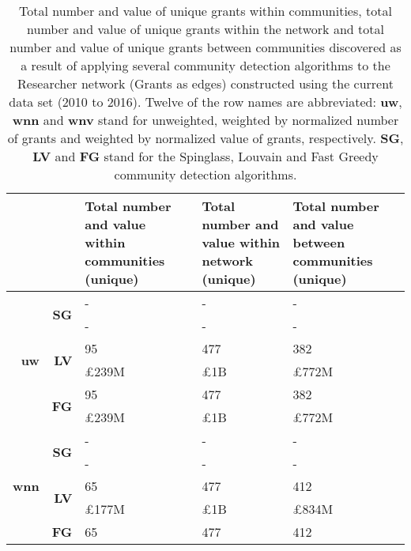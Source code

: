 \begin{table}[!htbp]
\centering
\caption[Total number and value of unique grants within communities, total number and value of unique grants within the network and total number and value of unique grants between communities discovered in the Researcher network (Grants as edges) constructed using the current data set (2010 to 2016)]{Total number and value of unique grants within communities, total number and value of unique grants within the network and total number and value of unique grants between communities discovered as a result of applying several community detection algorithms to the Researcher network (Grants as edges) constructed using the current data set (2010 to 2016). Twelve of the row names are abbreviated: \textbf{uw}, \textbf{wnn} and \textbf{wnv} stand for unweighted, weighted by normalized number of grants and weighted by normalized value of grants, respectively. \textbf{SG}, \textbf{LV} and \textbf{FG} stand for the Spinglass, Louvain and Fast Greedy community detection algorithms.}
\label{table:researcher_b_current_grants2_appendix}
\begin{tabular}{r|r|>{\raggedleft\arraybackslash}p{3.5cm}|>{\raggedleft\arraybackslash}p{3.2cm}|>{\raggedleft\arraybackslash}p{3.5cm}}
\multicolumn{2}{c|}{} & \textbf{Total number and value within communities (unique)} & \textbf{Total number and value within network (unique)} & \textbf{Total number and value between communities (unique)}\\
\hline
\multirow{6}{*}{\textbf{uw}}
& \multirow{2}{*}{\textbf{SG}}
& {-} & {-} & {-}\\
& {} & {-} & {-} & {-}\\
\cline{2-5}
& \multirow{2}{*}{\textbf{LV}}
& {95} & {477} & {382}\\
& {} & {\pounds239M} & {\pounds1B} & {\pounds772M}\\
\cline{2-5}
& \multirow{2}{*}{\textbf{FG}}
& {95} & {477} & {382}\\
& {} & {\pounds239M} & {\pounds1B} & {\pounds772M}\\
\hline
\multirow{6}{*}{\textbf{wnn}}
& \multirow{2}{*}{\textbf{SG}}
& {-} & {-} & {-}\\
& {} & {-} & {-} & {-}\\
\cline{2-5}
& \multirow{2}{*}{\textbf{LV}}
& {65} & {477} & {412}\\
& {} & {\pounds177M} & {\pounds1B} & {\pounds834M}\\
\cline{2-5}
& \multirow{2}{*}{\textbf{FG}}
& {65} & {477} & {412}\\

\end{tabular}
\end{table}
